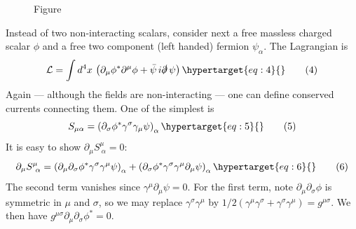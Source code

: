\documentclass[11pt,a4paper]{article}
\newcommand{\eqtarget}[1]{\hypertarget{eq:#1}{\mathstrut}\tag{#1}}
\begin{document}
\begin{figure}
\vspace{-1.3\baselineskip}
\centering

\par\smallskip
Figure~\thefigure
\vspace{-0.9\baselineskip}
\end{figure}

\begingroup
\renewcommand{\thefootnote}{\fnsymbol{footnote}}
\endgroup

Instead of two non-interacting scalars, consider next a free
massless charged scalar $\phi$ and a free two component (left handed)
fermion $\psi_\alpha$. The Lagrangian is
\begin{equation}
\mathcal{L} = \int d^4x\, \left(\partial_\mu \phi^* \partial^\mu \phi + \bar\psi\, i \slashed{\partial}\, \psi \right)
\eqtarget{4}
\end{equation}
Again --- although the fields are non-interacting --- one can define
conserved currents connecting them. One of the simplest is\begingroup\renewcommand{\thefootnote}{\fnsymbol{footnote}}\footnotemark[1]\endgroup
\begin{equation}
S_{\mu\alpha} = \left(\partial_\sigma \phi^* \gamma^\sigma \gamma_\mu \psi\right)_\alpha
\eqtarget{5}
\end{equation}
It is easy to show $\partial_\mu S^\mu_{\ \alpha} = 0$:
\begin{equation}
\partial_\mu S^\mu_{\ \alpha} = \left(\partial_\mu \partial_\sigma \phi^* \gamma^\sigma \gamma^\mu \psi\right)_\alpha + \left(\partial_\sigma \phi^* \gamma^\sigma \gamma^\mu \partial_\mu \psi\right)_\alpha
\eqtarget{6}
\end{equation}
The second term vanishes since $\gamma^\mu \partial_\mu \psi = 0$. For the first term, note
$\partial_\mu \partial_\sigma \phi$ is symmetric in $\mu$ and $\sigma$, so we may replace $\gamma^\sigma \gamma^\mu$ by
$1/2(\gamma^\mu \gamma^\sigma + \gamma^\sigma \gamma^\mu) = g^{\mu\sigma}$. We then have $g^{\mu\sigma}\partial_\mu \partial_\sigma \phi^* = 0$.
\end{document}
